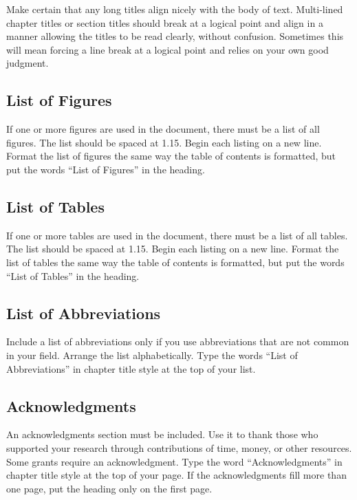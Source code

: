 Make certain that any long titles align nicely with the body of text.
Multi-lined chapter titles or section titles should break at a logical point and align in a manner allowing the titles to be read clearly, without confusion.
Sometimes this will mean forcing a line break at a logical point and relies on your own good judgment.

\subsection{List of Figures}

If one or more figures are used in the document, there must be a list of all figures.
The list should be spaced at 1.15.
Begin each listing on a new line.
Format the list of figures the same way the table of contents is formatted, but put the words ``List of Figures'' in the heading.

\subsection{List of Tables}

If one or more tables are used in the document, there must be a list of all tables.
The list should be spaced at 1.15.
Begin each listing on a new line.
Format the list of tables the same way the table of contents is formatted, but put the words ``List of Tables'' in the heading.

\subsection{List of Abbreviations}

Include a list of abbreviations only if you use abbreviations that are not common in your field.
Arrange the list alphabetically.
Type the words ``List of Abbreviations'' in chapter title style at the top of your list.

\subsection{Acknowledgments}

An acknowledgments section must be included.
Use it to thank those who supported your research through contributions of time, money, or other resources.
Some grants require an acknowledgment.
Type the word ``Acknowledgments'' in chapter title style at the top of your page.
If the acknowledgments fill more than one page, put the heading only on the first page.

